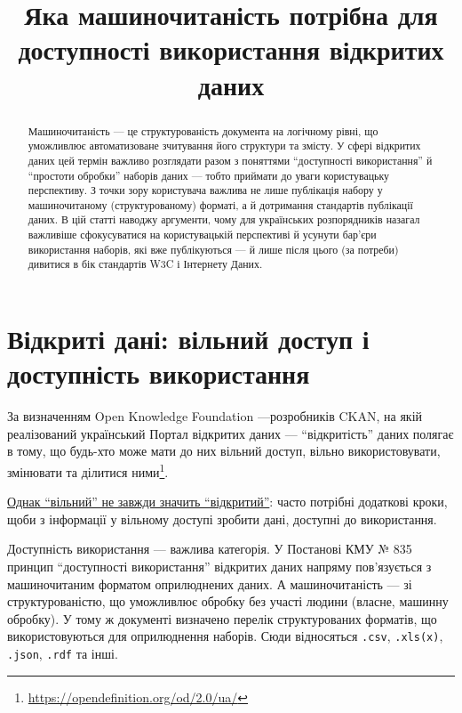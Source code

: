 \documentclass[
]{agujournal2019}
\begin{document}
\title{Яка машиночитаність потрібна для доступності використання
відкритих даних}



\begin{abstract}
Машиночитаність --- це структурованість документа на логічному рівні, що
уможливлює автоматизоване зчитування його структури та змісту. У сфері
відкритих даних цей термін важливо розглядати разом з поняттями
``доступності використання'' й ``простоти обробки'' наборів даних ---
тобто приймати до уваги користувацьку перспективу. З точки зору
користувача важлива не лише публікація набору у машиночитаному
(структурованому) форматі, а й дотримання стандартів публікації даних. В
цій статті наводжу аргументи, чому для українських розпорядників назагал
важливіше сфокусуватися на користувацькій перспективі й усунути бар'єри
використання наборів, які вже публікуються --- й лише після цього (за
потреби) дивитися в бік стандартів W3C і Інтернету Даних.
\end{abstract}





\section{Відкриті дані: вільний доступ і доступність
використання}\label{ux432ux456ux434ux43aux440ux438ux442ux456-ux434ux430ux43dux456-ux432ux456ux43bux44cux43dux438ux439-ux434ux43eux441ux442ux443ux43f-ux456-ux434ux43eux441ux442ux443ux43fux43dux456ux441ux442ux44c-ux432ux438ux43aux43eux440ux438ux441ux442ux430ux43dux43dux44f}

За визначенням Open Knowledge Foundation ---розробників CKAN, на якій
реалізований український Портал відкритих даних --- ``відкритість''
даних полягає в тому, що будь-хто може мати до них вільний доступ,
вільно використовувати, змінювати та ділитися ними\footnote{\url{https://opendefinition.org/od/2.0/ua/}}.

\href{https://aims.gitbook.io/open-data-mooc/unit-1-open-data-principles/lesson-1.1-what-is-open-data\#id-5.-challenges}{Однак
``вільний'' не завжди значить ``відкритий''}: часто потрібні додаткові
кроки, щоби з інформації у вільному доступі зробити дані, доступні до
використання.

Доступність використання --- важлива категорія. У Постанові КМУ № 835
принцип ``доступності використання'' відкритих даних напряму
пов'язується з машиночитаним форматом оприлюднених даних. А
машиночитаність --- зі структурованістю, що уможливлює обробку без
участі людини (власне, машинну обробку). У тому ж документі визначено
перелік структурованих форматів, що використовуються для оприлюднення
наборів. Сюди відносяться \texttt{.csv}, \texttt{.xls(x)},
\texttt{.json}, \texttt{.rdf} та інші.
\end{document}
